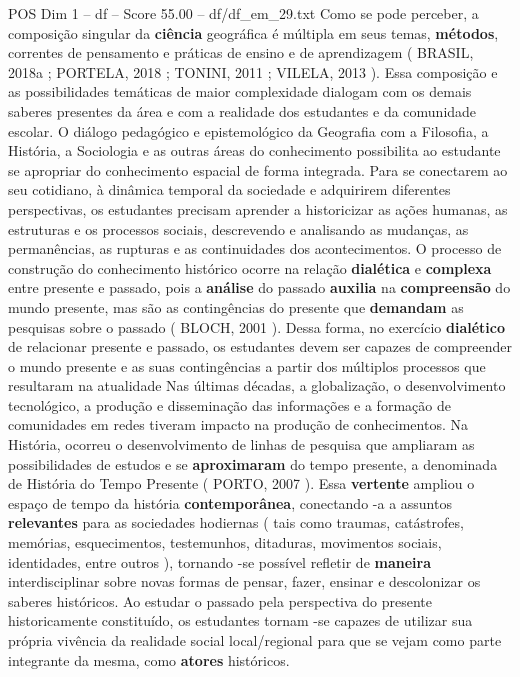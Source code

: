 \begin{textsample}{POS Dim 1 – df – Score 55.00 – df/df\_em\_29.txt}
Como se pode perceber, a composição singular da \textbf{ciência} geográfica é múltipla em seus temas, \textbf{métodos}, correntes de pensamento e práticas de ensino e de aprendizagem ( BRASIL, 2018a ; PORTELA, 2018 ; TONINI, 2011 ; VILELA, 2013 ).
Essa composição e as possibilidades temáticas de maior complexidade dialogam com os demais saberes presentes da área e com a realidade dos estudantes e da comunidade escolar.
O diálogo pedagógico e epistemológico da Geografia com a Filosofia, a História, a Sociologia e as outras áreas do conhecimento possibilita ao estudante se apropriar do conhecimento espacial de forma integrada.
Para se conectarem ao seu cotidiano, à dinâmica temporal da sociedade e adquirirem diferentes perspectivas, os estudantes precisam aprender a historicizar as ações humanas, as estruturas e os processos sociais, descrevendo e analisando as mudanças, as permanências, as rupturas e as continuidades dos acontecimentos.
O processo de construção do conhecimento histórico ocorre na relação \textbf{dialética} e \textbf{complexa} entre presente e passado, pois a \textbf{análise} do passado \textbf{auxilia} na \textbf{compreensão} do mundo presente, mas são as contingências do presente que \textbf{demandam} as pesquisas sobre o passado ( BLOCH, 2001 ).
Dessa forma, no exercício \textbf{dialético} de relacionar presente e passado, os estudantes devem ser capazes de compreender o mundo presente e as suas contingências a partir dos múltiplos processos que resultaram na atualidade Nas últimas décadas, a globalização, o desenvolvimento tecnológico, a produção e disseminação das informações e a formação de comunidades em redes tiveram impacto na produção de conhecimentos.
Na História, ocorreu o desenvolvimento de linhas de pesquisa que ampliaram as possibilidades de estudos e se \textbf{aproximaram} do tempo presente, a denominada de História do Tempo Presente ( PORTO, 2007 ).
Essa \textbf{vertente} ampliou o espaço de tempo da história \textbf{contemporânea}, conectando -a a assuntos \textbf{relevantes} para as sociedades hodiernas ( tais como traumas, catástrofes, memórias, esquecimentos, testemunhos, ditaduras, movimentos sociais, identidades, entre outros ), tornando -se possível refletir de \textbf{maneira} interdisciplinar sobre novas formas de pensar, fazer, ensinar e descolonizar os saberes históricos.
Ao estudar o passado pela perspectiva do presente historicamente constituído, os estudantes tornam -se capazes de utilizar sua própria vivência da realidade social local/regional para que se vejam como parte integrante da mesma, como \textbf{atores} históricos.

\end{textsample}
